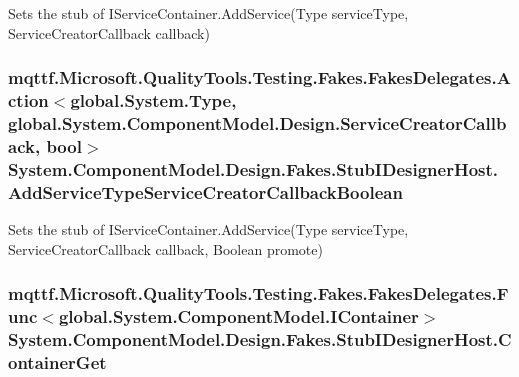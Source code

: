 Sets the stub of I\-Service\-Container.\-Add\-Service(\-Type service\-Type, Service\-Creator\-Callback callback)

\hypertarget{class_system_1_1_component_model_1_1_design_1_1_fakes_1_1_stub_i_designer_host_a7c7f8ec6c161f07b76cb64f00b01515c}{
\subsubsection[{Add\-Service\-Type\-Service\-Creator\-Callback\-Boolean}]{\setlength{\rightskip}{0pt plus 5cm}mqttf.\-Microsoft.\-Quality\-Tools.\-Testing.\-Fakes.\-Fakes\-Delegates.\-Action$<$global.\-System.\-Type, global.\-System.\-Component\-Model.\-Design.\-Service\-Creator\-Callback, bool$>$ System.\-Component\-Model.\-Design.\-Fakes.\-Stub\-I\-Designer\-Host.\-Add\-Service\-Type\-Service\-Creator\-Callback\-Boolean}}\label{class_system_1_1_component_model_1_1_design_1_1_fakes_1_1_stub_i_designer_host_a7c7f8ec6c161f07b76cb64f00b01515c}


Sets the stub of I\-Service\-Container.\-Add\-Service(\-Type service\-Type, Service\-Creator\-Callback callback, Boolean promote)

\hypertarget{class_system_1_1_component_model_1_1_design_1_1_fakes_1_1_stub_i_designer_host_a83f0d7dd2233e1b9c6481da8041b02c1}{
\subsubsection[{Container\-Get}]{\setlength{\rightskip}{0pt plus 5cm}mqttf.\-Microsoft.\-Quality\-Tools.\-Testing.\-Fakes.\-Fakes\-Delegates.\-Func$<$global.\-System.\-Component\-Model.\-I\-Container$>$ System.\-Component\-Model.\-Design.\-Fakes.\-Stub\-I\-Designer\-Host.\-Container\-Get}}\label{class_system_1_1_component_model_1_1_design_1_1_fakes_1_1_stub_i_designer_host_a83f0d7dd2233e1b9c6481da8041b02c1}


